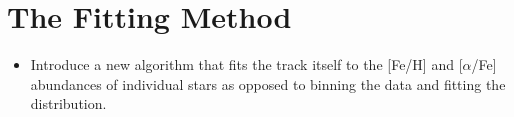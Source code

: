 \documentclass[ms.tex]{subfiles}
\begin{document}
\section{The Fitting Method}
\label{sec:fitting}

\begin{itemize}

\item Introduce a new algorithm that fits the track itself to the [Fe/H] and
[$\alpha$/Fe] abundances of individual stars as opposed to binning the data
and fitting the distribution.

\end{itemize}
\end{document}
